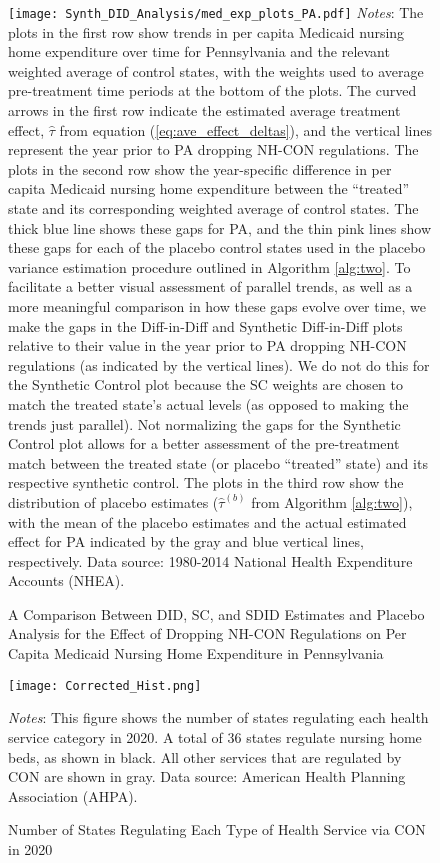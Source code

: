 \documentclass[../Main.tex]{subfiles}
\begin{document}
\newpage
\begin{figure}[t] 
	\caption{\label{fig:med_exp_plots_pa} \centering A Comparison Between DID, SC, and SDID Estimates and Placebo Analysis for the Effect of Dropping NH-CON Regulations on Per Capita Medicaid Nursing Home Expenditure in Pennsylvania}
    {\centering\texttt{[image: Synth\_DID\_Analysis/med\_exp\_plots\_PA.pdf]}}
    \scriptsize
		\textit{Notes}: The plots in the first row show trends in per capita Medicaid nursing home expenditure over time for Pennsylvania and the relevant weighted average of control states, with the weights used to average pre-treatment time periods at the bottom of the plots. The curved arrows in the first row indicate the estimated average treatment effect, $\hat{\tau}$ from equation (\ref{eq:ave_effect_deltas}), and the vertical lines represent the year prior to PA dropping NH-CON regulations. The plots in the second row show the year-specific difference in per capita Medicaid nursing home expenditure between the ``treated'' state and its corresponding weighted average of control states. The thick blue line shows these gaps for PA, and the thin pink lines show these gaps for each of the placebo control states used in the placebo variance estimation procedure outlined in Algorithm \ref{alg:two}. To facilitate a better visual assessment of parallel trends, as well as a more meaningful comparison in how these gaps evolve over time, we make the gaps in the Diff-in-Diff and Synthetic Diff-in-Diff plots relative to their value in the year prior to PA dropping NH-CON regulations (as indicated by the vertical lines). We do not do this for the Synthetic Control plot because the SC weights are chosen to match the treated state's actual levels (as opposed to making the trends just parallel). Not normalizing the gaps for the Synthetic Control plot allows for a better assessment of the pre-treatment match between the treated state (or placebo ``treated'' state) and its respective synthetic control. The plots in the third row show the distribution of placebo estimates ($\hat{\tau}^{(b)}$ from Algorithm \ref{alg:two}), with the mean of the placebo estimates and the actual estimated effect for PA indicated by the gray and blue vertical lines, respectively. Data source: 1980-2014 National Health Expenditure Accounts (NHEA).
\end{figure}
\clearpage




\newpage
\begin{figure}[t]
	\begin{center}
	\caption{\label{fig:nh_histogram} \centering Number of States Regulating Each Type of Health Service via CON in 2020}
    \texttt{[image: Corrected\_Hist.png]}
    \end{center}
    \footnotesize
		\textit{Notes}: This figure shows the number of states regulating each health service category in 2020. A total of 36 states regulate nursing home beds, as shown in black. All other services that are regulated by CON are shown in gray. Data source: American Health Planning Association (AHPA).
\end{figure}
\clearpage
\end{document}
